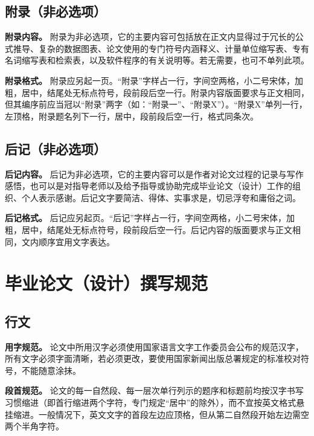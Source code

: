 \documentclass[singlesided]{Style/ucasthesis}%
\begin{document}
\hypertarget{section-21}{%
\subsection{附录（非必选项）}\label{section-21}}

\textbf{附录内容。} 附录为非必选项，它的主要内容可包括放在正文内显得过于冗长的公式推导、复杂的数据图表、论文使用的专门符号内涵释义、计量单位缩写表、专有名词缩写表和检索表，以及软件程序的有关说明等。若无需要，也可不单列此项。

\textbf{附录格式。} 附录应另起一页。``附录''字样占一行，字间空两格，小二号宋体，加粗，居中，结尾处无标点符号，段前段后空一行。附录内容版面要求与正文相同，但其编序前应当冠以``附录''两字（如：``附录一''、``附录X''）。``附录X''单列一行，左顶格，附录题名列下一行，居中，段前段后空一行，格式同条次。

\hypertarget{section-22}{%
\subsection{后记（非必选项）}\label{section-22}}

\textbf{后记内容。} 后记为非必选项，它的主要内容可以是作者对论文过程的记录与写作感悟，也可以是对指导老师以及给予指导或协助完成毕业论文（设计）工作的组织、个人表示感谢。后记文字要简洁、得体、实事求是，切忌浮夸和庸俗之词。

\textbf{后记格式。} 后记应另起页。``后记''字样占一行，字间空两格，小二号宋体，加粗，居中，结尾处无标点符号，段前段后空一行。后记内容的版面要求与正文相同，文内顺序宜用文字表达。

\hypertarget{section-23}{%
\section{毕业论文（设计）撰写规范}\label{section-23}}

\hypertarget{section-24}{%
\subsection{行文}\label{section-24}}

\textbf{用字规范。} 论文中所用汉字必须使用国家语言文字工作委员会公布的规范汉字，所有文字必须字面清晰，若必须更改，要使用国家新闻出版总署规定的标准校对符号，不能随意涂抺。

\textbf{段首规范。} 论文的每一自然段、每一层次单行列示的题序和标题前均按汉字书写习惯缩进（即首行缩进两个字符，专门规定``居中''的除外），而不宜按英文格式悬挂缩进。一般情况下，英文文字的首段左边应顶格，但从第二自然段开始左边需空两个半角字符。
\end{document}
